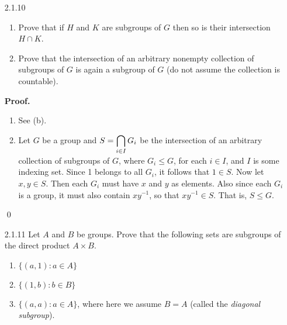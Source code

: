 \begin{enumerate}
      \textbf{Proof.} The set $SL_n(F)$ is nonempty since it contains the
      $n \times n$ identity matrix. Let $A, B \in SL_n(F)$. By membership in
      $SL_n(F)$ we have $\det(A) = 1$, so that $A^{-1}$ exists. Since the
      determinant of a product is the product of the determinants, it follows
      that $\det(A)\det(A^{-1}) = 1$, so that $\det(A^{-1}) = 1$; now
      $\det(AB^{-1}) = \det(A)\det(B^{-1}) = 1$, so that $AB^{-1} \in SL_n(F)$; 
      that is $SL_n(F) \le GL_n(F)$. \qed
   \item[2.1.10]  \begin{enumerate}
                     \item Prove that if $H$ and $K$ are subgroups of $G$ then
                           so is their intersection $H \cap K$.
                     \item Prove that the intersection of an arbitrary nonempty
                           collection of subgroups of $G$ is again a subgroup of
                           $G$ (do not assume the collection is countable).
                  \end{enumerate}

      \textbf{Proof.}

      \begin{enumerate}
         \item See (b).
         \item Let $G$ be a group and $S = \displaystyle\bigcap_{i \in I}G_i$ be the
               intersection of an arbitrary collection of subgroups of $G$,
               where $G_i \le G$, for each $i \in I$, and $I$ is some indexing   
               set. Since 1 belongs to all $G_i$, it follows that $1 \in S$. Now
               let $x, y \in S$. Then each $G_i$ must have $x$ and $y$ as
               elements. Also since each $G_i$ is a group, it must also contain
               $xy^{-1}$, so that $xy^{-1} \in S$. That is, $S \le G$.
      \end{enumerate} \qed
   \item[2.1.11]  Let $A$ and $B$ be groups. Prove that the following sets are
                  subgroups of the direct product $A \times B$.
                  \begin{enumerate}
                     \item $\{(a, 1) : a \in A\}$
                     \item $\{(1, b) : b \in B\}$
                     \item $\{(a, a) : a \in A\}$, where here we assume $B = A$
                           (called the \textit{diagonal subgroup}).
                  \end{enumerate}


\end{enumerate}
